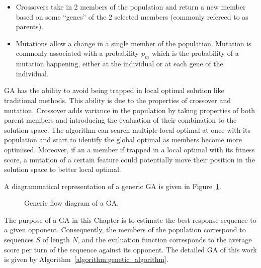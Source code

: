 \begin{itemize}
    \item Crossovers take in 2 members of the population and return a new member
    based on some ``genes'' of the 2 selected members (commonly refereed to as parents).
    \item Mutations allow a change in a single member of the population. Mutation
    is commonly associated with a probability \(p_m\) which is the probability
    of a mutation happening, either at the individual or at each gene of the
    individual.
\end{itemize}

GA has the ability to avoid being trapped in local optimal solution like
traditional methods. This ability is due to the properties of crossover and
mutation. Crossover adds variance in the population by taking properties of both
parent members and introducing the evaluation of their combination to the
solution space. The algorithm can search multiple local optimal at once with its
population and start to identify the global optimal as members become more
optimised. Moreover, if an a member if trapped in a local optimal with its
fitness score, a mutation of a certain feature could potentially move their
position in the solution space to better local optimal.

A diagrammatical representation of a generic GA is given in Figure~\ref{fig:ga_flow_diagram}.

\begin{figure}[!htbp]
    \centering
    
    \caption{Generic flow diagram of a GA.}\label{fig:ga_flow_diagram}
\end{figure}

The purpose of a GA in this Chapter is to estimate the best response sequence to
a given opponent. Consequently, the members of the population correspond to
sequences \(S\) of length \(N\), and the evaluation function corresponds to the
average score per turn of the sequence against its opponent. The detailed GA of
this work is given by Algorithm~\ref{algorithm:genetic_algorithm}.

